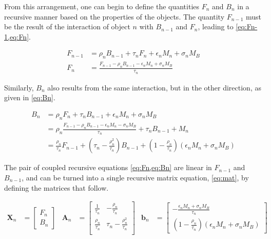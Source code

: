 \documentclass[11pt,a4paper]{article}
\begin{document}
From this arrangement, one can begin to define the quantities $ F_n $ and $ B_n $ in a recursive manner based on the properties of the objects. The quantity $ F_{n-1} $ must be the result of the interaction of object $ n $ with $ B_{n-1} $ and $ F_{n} $, leading to \cref{eq:Fn-1,eq:Fn}.

\begin{align}
	F_{n-1} &= \rho_n B_{n-1} + \tau_n F_n + \epsilon_n M_n + \sigma_n M_B \label{eq:Fn-1} \\
	F_n &= \frac{F_{n-1} - \rho_n B_{n-1} - \epsilon_n M_n + \sigma_n M_B}{\tau_n}\label{eq:Fn}
\end{align}

Similarly, $ B_n $ also results from the same interaction, but in the other direction, as given in \cref{eq:Bn}.

\begin{equation}\label{eq:Bn}
	\begin{split}
		B_n &= \rho_n F_n + \tau_n B_{n-1} + \epsilon_n M_n + \sigma_n M_B \\
		&= \rho_n \frac{F_{n-1} - \rho_n B_{n-1} - \epsilon_n M_n - \sigma_n M_B}{\tau_n} + \tau_n B_{n-1} + M_n \\
		&= \frac{\rho_n}{\tau_n} F_{n-1} + \left(\tau_n - \frac{\rho_n^2}{\tau_n}\right) B_{n-1} + \left(1 - \frac{\rho_n}{\tau_n}\right) \left(\epsilon_n M_n + \sigma_n M_B\right)
	\end{split}
\end{equation}

The pair of coupled recursive equations \cref{eq:Fn,eq:Bn} are linear in $ F_{n-1} $ and $ B_{n-1} $, and can be turned into a single recursive matrix equation, \cref{eq:mat}, by defining the matrices that follow.

\begin{align*}
	\bm{X}_n &=
	\begin{bmatrix}
		F_n \\ B_n
	\end{bmatrix}
	&
	\bm{A}_n &=
	\begin{bmatrix}
		\frac{1}{\tau_n} & -\frac{\rho_n}{\tau_n} \\
		\frac{\rho_n}{\tau_n} & \tau_n-\frac{\rho_n^2}{\tau_n} \\
	\end{bmatrix}
	&
	\bm{b}_n &= 
	\begin{bmatrix}
		-\frac{\epsilon_n M_n + \sigma_n M_B}{\tau_n}\\[4pt]
		\left(1 - \frac{\rho_n}{\tau_n}\right) \left(\epsilon_n M_n + \sigma_n M_B\right)
	\end{bmatrix}
\end{align*}
\end{document}

